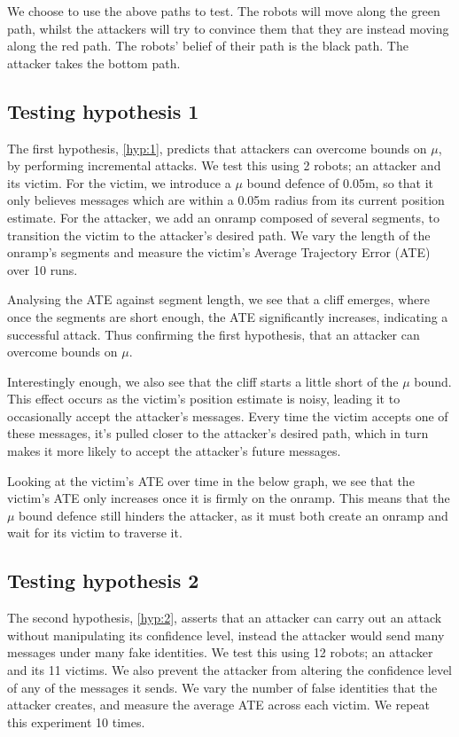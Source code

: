 We choose to use the above paths to test. The robots will move along the green path, whilst the attackers will try to convince them that they are instead moving along the red path. The robots' belief of their path is the black path. The attacker takes the bottom path.


\subsection{Testing hypothesis 1}
The first hypothesis, \ref{hyp:1}, predicts that attackers can overcome bounds on $\mu$, by performing incremental attacks. We test this using 2 robots; an attacker and its victim. For the victim, we introduce a $\mu$ bound defence of 0.05m, so that it only believes messages which are within a 0.05m radius from its current position estimate. For the attacker, we add an onramp composed of several segments, to transition the victim to the attacker's desired path. We vary the length of the onramp's segments and measure the victim's Average Trajectory Error (ATE) over 10 runs.


Analysing the ATE against segment length, we see that a cliff emerges, where once the segments are short enough, the ATE significantly increases, indicating a successful attack. Thus confirming the first hypothesis, that an attacker can overcome bounds on $\mu$.

% 

Interestingly enough, we also see that the cliff starts a little short of the $\mu$ bound. This effect occurs as the victim's position estimate is noisy, leading it to occasionally accept the attacker's messages. Every time the victim accepts one of these messages, it's pulled closer to the attacker's desired path, which in turn makes it more likely to accept the attacker's future messages.

Looking at the victim's ATE over time in the below graph, we see that the victim's ATE only increases once it is firmly on the onramp. This means that the $\mu$ bound defence still hinders the attacker, as it must both create an onramp and wait for its victim to traverse it.


\subsection{Testing hypothesis 2}
The second hypothesis, \ref{hyp:2}, asserts that an attacker can carry out an attack without manipulating its confidence level, instead the attacker would send many messages under many fake identities. We test this using 12 robots; an attacker and its 11 victims. We also prevent the attacker from altering the confidence level of any of the messages it sends. We vary the number of false identities that the attacker creates, and measure the average ATE across each victim. We repeat this experiment 10 times.

